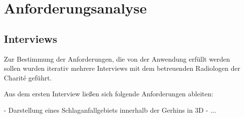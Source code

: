 
\chapter{Anforderungsanalyse}

\section{Interviews}

Zur Bestimmung der Anforderungen, die von der Anwendung erfüllt werden sollen wurden iterativ mehrere Interviews mit dem betreuenden Radiologen der Charité geführt.

Aus dem ersten Interview ließen sich folgende Anforderungen ableiten:

- Darstellung eines Schlaganfallgebiets innerhalb der Gerhins in 3D
- ...